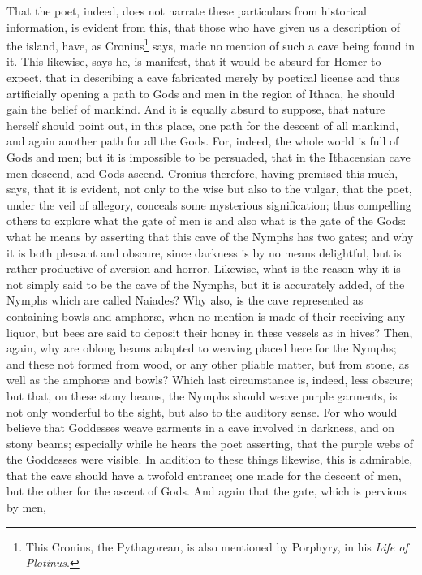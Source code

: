 \documentclass[12pt]{article}
\begin{document}
\noindent That the poet, indeed, does not narrate these particulars from
historical information, is evident from this, that those who have given us a
description of the island, have, as Cronius\footnote{This Cronius, the
Pythagorean, is also mentioned by Porphyry, in his \textit{Life of Plotinus}.}
says, made no mention of such a cave being found in it. This likewise, says he,
is manifest, that it would be absurd for Homer to expect, that in describing a
cave fabricated merely by poetical license and thus artificially opening a path
to Gods and men in the region of Ithaca, he should gain the belief of mankind.
And it is equally absurd to suppose, that nature herself should point out, in
this place, one path for the descent of all mankind, and again another path for
all the Gods. For, indeed, the whole world is full of Gods and men; but it is
impossible to be persuaded, that in the Ithacensian cave men descend, and Gods
ascend. Cronius therefore, having premised this much, says, that it is
evident, not only to the wise but also to the vulgar, that the poet, under the
veil of allegory, conceals some mysterious signification; thus compelling
others to explore what the gate of men is and also what is the gate of the
Gods: what he means by asserting that this cave of the Nymphs has two gates;
and why it is both pleasant and obscure, since darkness is by no means
delightful, but is rather productive of aversion and horror. Likewise, what is
the reason why it is not simply said to be the cave of the Nymphs, but it is
accurately added, of the Nymphs which are called Naiades? Why also, is the cave
represented as containing bowls and amphor{\ae}, when no mention is made of
their receiving any liquor, but bees are said to deposit their honey in these
vessels as in hives? Then, again, why are oblong beams adapted to weaving
placed here for the Nymphs; and these not formed from wood, or any other
pliable matter, but from stone, as well as the amphor{\ae} and bowls? Which
last circumstance is, indeed, less obscure; but that, on these stony beams, the
Nymphs should weave purple garments, is not only wonderful to the sight, but
also to the auditory sense. For who would believe that Goddesses weave
garments in a cave involved in darkness, and on stony beams; especially while
he hears the poet asserting, that the purple webs of the Goddesses were
visible. In addition to these things likewise, this is admirable, that the cave
should have a twofold entrance; one made for the descent of men, but the other
for the ascent of Gods. And again that the gate, which is pervious by men,
\end{document}
